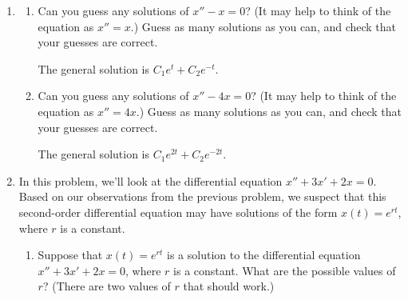 \documentclass[main]{subfiles}
\begin{document}
\begin{enumerate}




  \item 
  \begin{enumerate}
  
  \item
  \begin{problem}[\vfill]
    Can you guess any solutions of $x'' - x = 0$?  (It may help to think
    of the equation as $x'' = x$.)  Guess as many solutions as you can,
    and check that your guesses are correct.
  \end{problem}

  \begin{solution}
  The general solution is $C_1 e^t + C_2 e^{-t}$.
  \end{solution}  
  
  \item 
  \begin{problem}[\vfill]
  Can you guess any solutions of $x'' - 4x = 0$?  (It may help to think
  of the equation as $x'' = 4x$.)  Guess as many solutions as you can,
  and check that your guesses are correct.
  \end{problem}

  \begin{solution}
  The general solution is $C_1 e^{2t} + C_2 e^{-2t}$.
  \end{solution}  

\end{enumerate}

\pspace{\newpage}

  \item 
  In this problem, we'll look at the differential equation $x'' + 3x' + 2x
  = 0$. Based on our observations from the previous problem, we suspect that this second-order differential equation may have solutions of the form $x(t)=e^{rt}$, where $r$ is a constant.
  \begin{enumerate}
    \item
    
    \begin{problem}[3in]
    Suppose that $x(t) = e^{rt}$ is a solution to the differential equation $x'' + 3x' + 2x
  = 0$, where $r$ is a constant. What are the possible values of $r$? (There are two values of $r$ that should work.)
    \end{problem}


\end{enumerate}
\end{enumerate}
\end{document}
